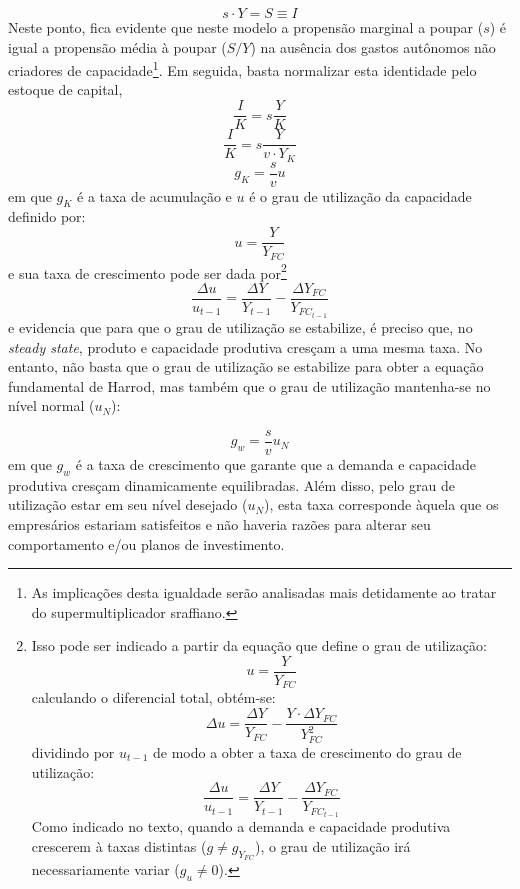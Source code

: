 $$
s\cdot Y = S \equiv I
$$
Neste ponto, fica evidente que neste modelo a propensão marginal a poupar ($s$) é igual a propensão média à poupar ($S/Y$) na ausência dos gastos autônomos não criadores de capacidade\footnote{As implicações desta igualdade serão analisadas mais detidamente ao tratar do supermultiplicador sraffiano.}. Em seguida, basta normalizar esta identidade pelo estoque de capital,
$$
\frac{I}{K} = s\frac{Y}{K}
$$
$$
\frac{I}{K} = s\frac{Y}{v\cdot Y_K}
$$
\begin{equation}
    g_K = \frac{s}{v}u
\end{equation}
em que $g_K$ é a taxa de acumulação e $u$ é o grau de utilização da capacidade definido por:
$$
u = \frac{Y}{Y_{FC}}
$$
e sua taxa de crescimento pode ser dada por\footnote{Isso pode ser indicado a partir da equação que define o grau de utilização:
	$$
	u = \frac{Y}{Y_{FC}}
	$$
	calculando o diferencial total, obtém-se:
	$$
	\Delta u = \frac{\Delta Y}{ Y_{FC}} - \frac{Y\cdot \Delta Y_{FC}}{Y_{FC}^2}
	$$
	dividindo por $u_{t-1}$ de modo a obter a taxa de crescimento do grau de utilização:
	$$
	\frac{\Delta u}{u_{t-1}} = \frac{\Delta Y}{Y_{t-1}} - \frac{\Delta Y_{FC}}{Y_{FC_{t-1}}}
	$$
	Como indicado no texto, quando a demanda e capacidade produtiva crescerem à taxas distintas ($g \neq g_{Y_{FC}}$), o grau de utilização irá necessariamente variar ($g_u \neq 0$).
}
$$
\frac{\Delta u}{u_{t-1}} = \frac{\Delta Y}{Y_{t-1}} - \frac{\Delta Y_{FC}}{Y_{FC_{t-1}}}
$$
e evidencia que para que o grau de utilização se estabilize, é preciso que, no \textit{steady state}, produto e capacidade produtiva cresçam a uma mesma taxa. 
No entanto, não basta que o grau de utilização se estabilize para obter a equação fundamental de Harrod, mas também que o grau de utilização mantenha-se no nível normal ($u_N$):

\begin{equation}
    \label{Fundamental}
    g_w = \frac{s}{v}u_N
\end{equation}
em que $g_w$ é a taxa de crescimento que garante que a demanda e capacidade produtiva cresçam dinamicamente equilibradas. Além disso, pelo grau de utilização estar em seu nível desejado ($u_N$), esta taxa corresponde àquela que os empresários estariam satisfeitos e não haveria razões para alterar seu comportamento e/ou planos de investimento. 

